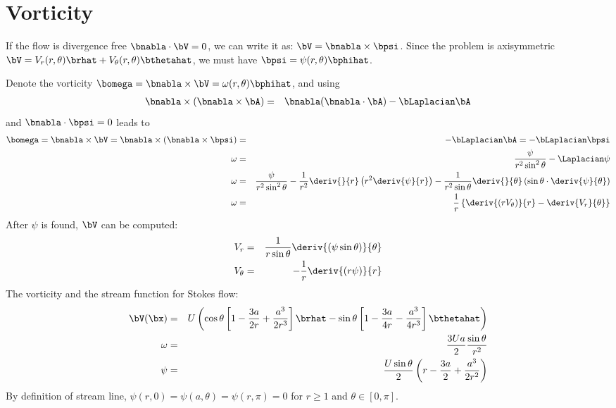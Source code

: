 \section{Vorticity}
If the flow is divergence free $\bnabla \cdot \bV = 0$,
we can write it as: $\bV = \bnabla \times \bpsi$.
Since the problem is axisymmetric
$\bV = V_r(r,\theta)\brhat + V_\theta(r,\theta)\bthetahat$,
we must have $\bpsi = \psi(r,\theta) \bphihat$.

Denote the vorticity $\bomega = \bnabla \times \bV =
\omega(r, \theta) \bphihat$,
and using
\begin{eqnarray}
  \bnabla \times (\bnabla \times \bA) &=&
  \bnabla (\bnabla \cdot \bA) - \bLaplacian \bA
\end{eqnarray}
and $\bnabla \cdot \bpsi = 0$ leads to
\begin{eqnarray}
  \bomega = \bnabla \times \bV = \bnabla \times (\bnabla \times \bpsi) &=& - \bLaplacian \bA = - \bLaplacian \bpsi \\
  \omega &=& \frac{\psi}{r^2 \sin^2\theta} - \Laplacian \psi \\
  \omega &=& \frac{\psi}{r^2 \sin^2\theta} - \frac{1}{r^2}\deriv{}{r} \left( r^2 \deriv{\psi}{r} \right) - \frac{1}{r^2 \sin\theta} \deriv{}{\theta}\left( \sin\theta \cdot \deriv{\psi}{\theta}\right) \\
  \omega &=& \frac{1}{r}\left\{\deriv{(r V_\theta)}{r} - \deriv{V_r}{\theta}\right\}
\end{eqnarray}
After $\psi$ is found, $\bV$ can be computed:
\begin{eqnarray}
  V_r &=& \frac{1}{r \sin\theta}\deriv{(\psi \sin\theta)}{\theta} \\
  V_\theta &=& -\frac{1}{r}\deriv{(r \psi)}{r}
\end{eqnarray}
The vorticity and the stream function for Stokes flow:
\begin{eqnarray}
\bV(\bx) &=& U \left(
\cos\theta \left[1 - \frac{3a}{2r} + \frac{a^3}{2r^3}\right] \brhat -
\sin\theta \left[1 - \frac{3a}{4r} - \frac{a^3}{4r^3}\right] \bthetahat
\right) \\
\omega &=& \frac{3 U a}{2} \frac{\sin\theta}{r^2} \\
\psi &=& \frac{U \sin\theta}{2} \left( r - \frac{3a}{2} + \frac{a^3}{2r^2} \right)
\end{eqnarray}
By definition of stream line,
$\psi(r, 0) = \psi(a, \theta) = \psi(r, \pi) = 0$
for $r \ge 1$ and $\theta \in [0, \pi]$.
